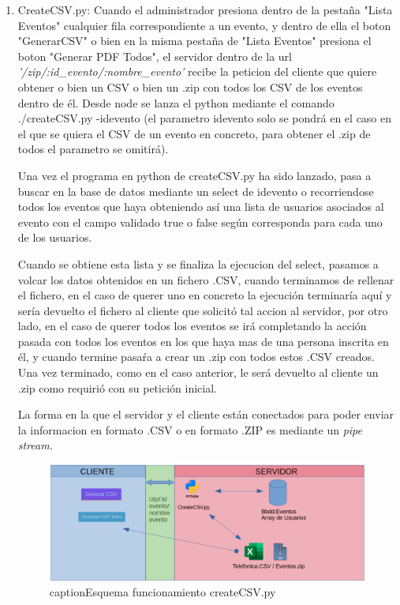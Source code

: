 \documentclass[a4paper, 12pt]{book}
\begin{document}
\begin{enumerate}
  	\item CreateCSV.py: Cuando el administrador presiona dentro de la pestaña "Lista Eventos" cualquier fila correspondiente a un evento, y dentro de ella el boton "GenerarCSV" o bien en la misma pestaña de "Lista Eventos" presiona el boton "Generar PDF Todos", el servidor dentro de la url \textit{'/zip/:id\_evento/:nombre\_evento'} recibe la peticion del cliente que quiere obtener o bien un CSV o bien un .zip con todos los CSV de los eventos dentro de él. Desde node se lanza el python mediante el comando ./createCSV.py -idevento (el parametro idevento solo se pondrá en el caso en el que se quiera el CSV de un evento en concreto, para obtener el .zip de todos el parametro se omitirá).
  	
  	Una vez el programa en python de createCSV.py ha sido lanzado, pasa a buscar en la base de datos mediante un select de idevento o recorriendose todos los eventos que haya obteniendo así una lista de usuarios asociados al evento con el campo validado true o false según corresponda para cada uno de los usuarios.
  	
  	Cuando se obtiene esta lista y se finaliza la ejecucion del select, pasamos a volcar los datos obtenidos en un fichero .CSV, cuando terminamos de rellenar el fichero, en el caso de querer uno en concreto la ejecución terminaría aquí y sería devuelto el fichero al cliente que solicitó tal accion al servidor, por otro lado, en el caso de querer todos los eventos se irá completando la acción pasada con todos los eventos en los que haya mas de una persona inscrita en él, y cuando termine pasaŕa a crear un .zip con todos estos .CSV creados. Una vez terminado, como en el caso anterior, le será devuelto al cliente un .zip como requirió con su petición inicial.
  	
  	La forma en la que el servidor y el cliente están conectados para poder enviar la informacion en formato .CSV o en formato .ZIP es mediante un \textit{pipe stream.}

\begin{figure}[H]
  \centering
  \includegraphics[width=16cm, keepaspectratio]{img/createCSV.png}
  	caption{Esquema funcionamiento createCSV.py}\label{fig:createCSV}
\end{figure}  	
  	

\end{enumerate}
\end{document}
